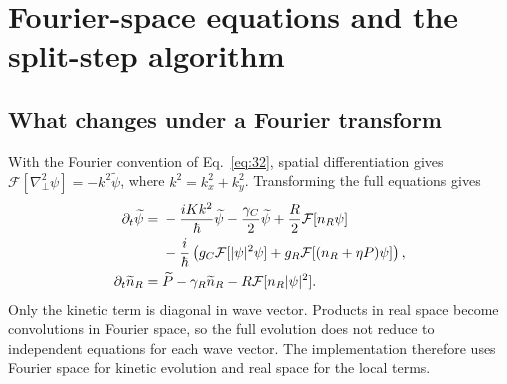 \section{Fourier-space equations and the split-step algorithm}\label{sec:B}

\subsection{What changes under a Fourier transform}\label{sec:B.1}
With the Fourier convention of Eq.~\eqref{eq:32}, spatial differentiation gives
\(\mathcal F[\nabla_\perp^2\psi]=-k^2\widetilde\psi\), where
\(k^2=k_x^2+k_y^2\). Transforming the full equations gives
\begin{align}
\partial_t\widetilde\psi={}&-\frac{iKk^2}{\hbar}\widetilde\psi
-\frac{\gamma_C}{2}\widetilde\psi
+\frac{R}{2}\mathcal F[n_R\psi]\notag\\
&-\frac{i}{\hbar}\left(g_C\mathcal F[|\psi|^2\psi]
+g_R\mathcal F[(n_R+\eta P)\psi]\right),\label{eq:B.field}\\
\partial_t\widetilde n_R={}&\widetilde P-\gamma_R\widetilde n_R
-R\mathcal F[n_R|\psi|^2].\label{eq:B.reservoir}
\end{align}
Only the kinetic term is diagonal in wave vector. Products in real space
become convolutions in Fourier space, so the full evolution does not reduce
to independent equations for each wave vector. The implementation therefore
uses Fourier space for kinetic evolution and real space for the local terms.

